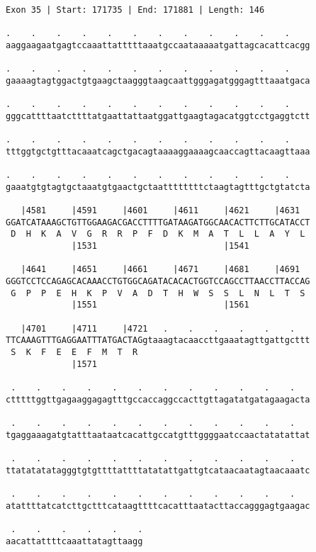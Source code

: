 \documentclass{article}
\begin{document}
\newpage
\begin{Verbatim}
Exon 35 | Start: 171735 | End: 171881 | Length: 146
 
.    .    .    .    .    .    .    .    .    .    .    .    
aaggaagaatgagtccaaattatttttaaatgccaataaaaatgattagcacattcacgg
  
.    .    .    .    .    .    .    .    .    .    .    .    
gaaaagtagtggactgtgaagctaagggtaagcaattgggagatgggagtttaaatgaca
  
.    .    .    .    .    .    .    .    .    .    .    .    
gggcattttaatcttttatgaattattaatggattgaagtagacatggtcctgaggtctt
  
.    .    .    .    .    .    .    .    .    .    .    .    
tttggtgctgtttacaaatcagctgacagtaaaaggaaaagcaaccagttacaagttaaa
  
.    .    .    .    .    .    .    .    .    .    .    .    
gaaatgtgtagtgctaaatgtgaactgctaattttttttctaagtagtttgctgtatcta
  
   |4581     |4591     |4601     |4611     |4621     |4631  
GGATCATAAAGCTGTTGGAAGACGACCTTTTGATAAGATGGCAACACTTCTTGCATACCT
 D  H  K  A  V  G  R  R  P  F  D  K  M  A  T  L  L  A  Y  L 
             |1531                         |1541            
  
   |4641     |4651     |4661     |4671     |4681     |4691  
GGGTCCTCCAGAGCACAAACCTGTGGCAGATACACACTGGTCCAGCCTTAACCTTACCAG
 G  P  P  E  H  K  P  V  A  D  T  H  W  S  S  L  N  L  T  S 
             |1551                         |1561            
  
   |4701     |4711     |4721   .    .    .    .    .    .   
TTCAAAGTTTGAGGAATTTATGACTAGgtaaagtacaaccttgaaatagttgattgcttt
 S  K  F  E  E  F  M  T  R                                  
             |1571                                          
  
 .    .    .    .    .    .    .    .    .    .    .    .   
ctttttggttgagaaggagagtttgccaccaggccacttgttagatatgatagaagacta
  
 .    .    .    .    .    .    .    .    .    .    .    .   
tgaggaaagatgtatttaataatcacattgccatgtttggggaatccaactatatattat
  
 .    .    .    .    .    .    .    .    .    .    .    .   
ttatatatatagggtgtgttttattttatatattgattgtcataacaatagtaacaaatc
  
 .    .    .    .    .    .    .    .    .    .    .    .   
atattttatcatcttgctttcataagttttcacatttaatacttaccagggagtgaagac
  
 .    .    .    .    .    .
aacattattttcaaattatagttaagg
\end{Verbatim}
\end{document}
